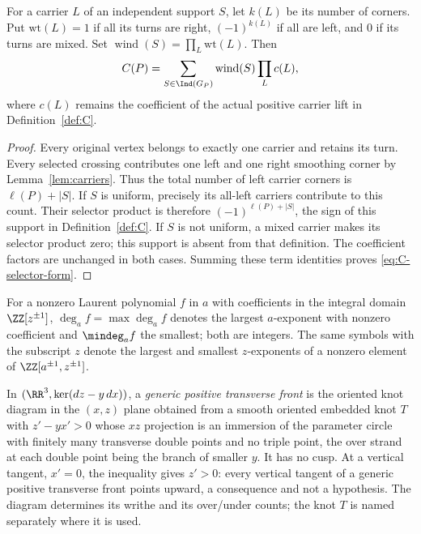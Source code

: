 \begin{lemma}\label{lem:C-X1}\leanok
For a carrier $L$ of an independent support $S$, let $k(L)$ be its number
of corners. Put $\mathrm{wt}(L)=1$ if all its turns are right,
$(-1)^{k(L)}$ if all are left, and $0$ if its turns are mixed.
Set $\operatorname{wind}(S)=\prod_L\mathrm{wt}(L)$. Then
\begin{equation}\label{eq:C-selector-form}
C(P)=\sum_{S\in\Ind(G_P)}\operatorname{wind}(S)\prod_L c(L),
\end{equation}
where $c(L)$ remains the coefficient of the actual positive carrier lift
in Definition~\ref{def:C}.

\end{lemma}
\begin{proof}\leanok{}
Every original vertex belongs to exactly one carrier and retains its turn.
Every selected crossing contributes one left and one right smoothing
corner by Lemma~\ref{lem:carriers}. Thus the total number of left carrier
corners is $\ell(P)+|S|$. If $S$ is uniform, precisely its all-left
carriers contribute to this count. Their selector product is therefore
$(-1)^{\ell(P)+|S|}$, the sign of this support in Definition~\ref{def:C}.
If $S$ is not uniform, a mixed carrier makes its selector product zero;
this support is absent from that definition. The coefficient factors
are unchanged in both cases. Summing these term identities proves
\eqref{eq:C-selector-form}.
\end{proof}

\begin{definition}[degrees in $a$]\label{def:adeg}\leanok
For a nonzero Laurent polynomial $f$ in $a$ with coefficients in the
integral domain $\ZZ[z^{\pm1}]$, $\deg_af=\max\deg_af$ denotes the largest
$a$-exponent with nonzero coefficient and $\mindeg_af$ the smallest; both
are integers. The same symbols with the subscript $z$ denote the largest and
smallest $z$-exponents of a nonzero element of $\ZZ[a^{\pm1},z^{\pm1}]$.
\end{definition}

\begin{definition}\label{def:transverse-front}\leanok
In $(\RR^3,\ker(dz-y\,dx))$, a \emph{generic positive transverse front} is
the oriented knot diagram in the $(x,z)$ plane obtained from a smooth oriented
embedded knot $T$ with $z'-yx'>0$ whose $xz$ projection is an immersion of
the parameter circle with finitely many transverse double points and no
triple point, the over strand at each double point being the branch of
smaller $y$. It has no cusp. At a vertical tangent, $x'=0$, the inequality
gives $z'>0$: every vertical tangent of a generic positive transverse front
points upward, a consequence and not a hypothesis. The diagram determines
its writhe and its over/under counts; the knot $T$ is named separately where
it is used.
\end{definition}

